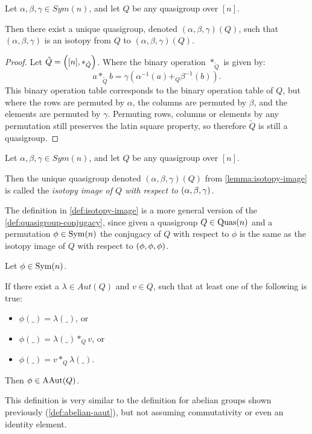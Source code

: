 \begin{lemma} \label{lemma:isotopy-image}
    Let \( \alpha, \beta, \gamma \in Sym(n) \), and let \( Q \) be any quasigroup over \( [n] \).

    Then there exist a unique quasigroup, denoted \( (\alpha, \beta, \gamma)(Q) \), such that \( (\alpha, \beta, \gamma) \) is an isotopy from \( Q \) to \( (\alpha, \beta, \gamma)(Q) \).
\end{lemma}
\begin{proof}
    Let \( \tilde{Q} = \left( [n], *_{\tilde{Q}} \right) \). Where the binary operation \( *_{\tilde{Q}} \) is given by:
    \[
        a *_{\tilde{Q}} b = \gamma(\alpha^{-1}(a) +_Q \beta^{-1}(b)).
    \]
    This binary operation table corresponds to the binary operation table of \( Q \), but where the rows are permuted by \( \alpha \), the columns are permuted by \( \beta \), and the elements are permuted by \( \gamma \). Permuting rows, columns or elements by any permutation still preserves the latin square property, so therefore \( \tilde{Q} \) is still a quasigroup.
\end{proof}

\begin{definition} \label{def:isotopy-image}
    Let \( \alpha, \beta, \gamma \in Sym(n) \), and let \( Q \) be any quasigroup over \( [n] \).

    Then the unique quasigroup denoted \( (\alpha, \beta, \gamma)(Q) \) from \autoref{lemma:isotopy-image} is called the \emph{isotopy image of \( Q \) with respect to \( \left( \alpha, \beta, \gamma \right) \)}.
\end{definition}

\begin{remark}
    The definition in \autoref{def:isotopy-image} is a more general version of the \autoref{def:quasigroup-conjugacy}, since given a quasigroup \( Q \in \operatorname{Quas}(n) \) and a permutation \( \phi \in \operatorname{Sym}(n) \) the conjugacy of \( Q \) with respect to \( \phi \) is the same as the isotopy image of \( Q \) with respect to \( \left( \phi, \phi, \phi \right) \).
\end{remark}

\begin{definition}
    Let \( \phi \in \operatorname{Sym}(n) \).
    
    If there exist a \( \lambda \in Aut(Q) \) and \( v \in Q \), such that at least one of the following is true:
    \begin{itemize}
        \item \( \phi(\_) = \lambda(\_) \), or
        \item \( \phi(\_) = \lambda(\_) *_Q v \), or
        \item \( \phi(\_) = v *_Q \lambda(\_) \).
    \end{itemize}

    Then \( \phi \in \operatorname{AAut}(Q) \).
\end{definition}
\begin{remark}
    This definition is very similar to the definition for abelian groups shown previously (\autoref{def:abelian-aaut}), but not assuming commutativity or even an identity element.
\end{remark}

